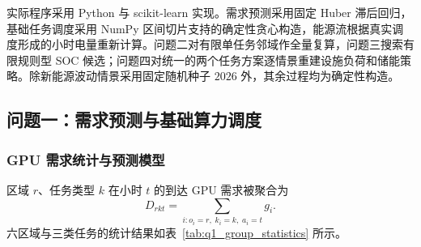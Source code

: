 
实际程序采用 Python 与 scikit-learn 实现。需求预测采用固定 Huber 滞后回归，基础任务调度采用 NumPy 区间切片支持的确定性贪心构造，能源流根据真实调度形成的小时电量重新计算。问题二对有限单任务邻域作全量复算，问题三搜索有限规则型 SOC 候选；问题四对统一的两个任务方案逐情景重建设施负荷和储能策略。除新能源波动情景采用固定随机种子 $2026$ 外，其余过程均为确定性构造。

\subsection{问题一：需求预测与基础算力调度}

\subsubsection{GPU 需求统计与预测模型}

区域 $r$、任务类型 $k$ 在小时 $t$ 的到达 GPU 需求被聚合为
\begin{equation}
D_{rkt}=\sum_{i:o_i=r,\;k_i=k,\;a_i=t}g_i.
\end{equation}
六区域与三类任务的统计结果如表~\ref{tab:q1_group_statistics} 所示。

